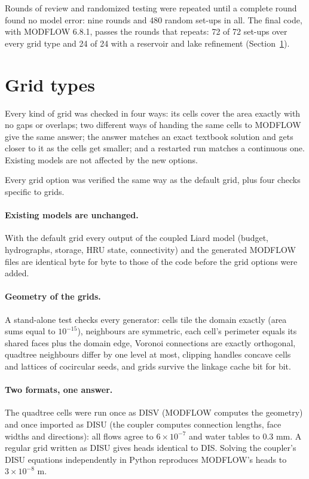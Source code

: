 Rounds of review and randomized testing were repeated until a complete round found no model error: nine rounds and 480 random
set-ups in all. The final code, with MODFLOW 6.8.1, passes the rounds that  repeats: 72 of 72 set-ups
over every grid type and 24 of 24 with a reservoir and lake refinement (Section~\ref{sec:vgrids}).

\section{Grid types}\label{sec:vgrids}
\begin{plain}
Every kind of grid was checked in four ways: its cells cover the area exactly with no gaps or overlaps; two different ways of
handing the same cells to MODFLOW give the same answer; the answer matches an exact textbook solution and gets closer to it
as the cells get smaller; and a restarted run matches a continuous one. Existing models are not affected by the new options.
\end{plain}
Every grid option was verified the same way as the default grid, plus four checks specific to grids.

\paragraph{Existing models are unchanged.} With the default grid every output of the coupled Liard model (budget,
hydrographs, storage, HRU state, connectivity) and the generated MODFLOW files are identical byte for byte to those of the
code before the grid options were added.

\paragraph{Geometry of the grids.} A stand-alone test checks every generator: cells tile the domain exactly (area sums
equal to $10^{-15}$), neighbours are symmetric, each cell's perimeter equals its shared faces plus the domain edge, Voronoi
connections are exactly orthogonal, quadtree neighbours differ by one level at most, clipping handles concave cells and
lattices of cocircular seeds, and grids survive the linkage cache bit for bit.

\paragraph{Two formats, one answer.} The quadtree cells were run once as DISV (MODFLOW computes the geometry) and once
imported as DISU (the coupler computes connection lengths, face widths and directions): all flows agree to $6\times10^{-7}$ and
water tables to 0.3 mm. A regular grid written as DISU gives heads identical to DIS. Solving the coupler's DISU equations
independently in Python reproduces MODFLOW's heads to $3\times10^{-8}$ m.

